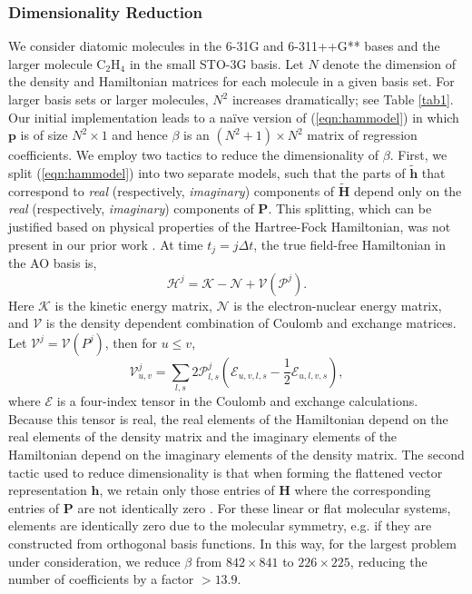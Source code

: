 \documentclass[10pt]{article}
\newcommand{\ethylene}{\ensuremath{\text{C}_2\text{H}_4} }
\begin{document}
\subsubsection{Dimensionality Reduction}
We consider diatomic molecules in the 6-31G and 6-311++G** bases and the larger molecule \ethylene in the small STO-3G basis.  Let $N$ denote the dimension of the density and Hamiltonian matrices for each molecule in a given basis set. For larger basis sets or larger molecules, $N^2$ increases dramatically; see Table \ref{tab1}.  Our initial implementation leads to a na\"ive version of (\ref{eqn:hammodel}) in which $\mathbf{p}$ is of size $N^2 \times 1$ and hence $\beta$ is an $(N^2 + 1) \times N^2$ matrix of regression coefficients.  We employ two tactics to reduce the dimensionality of $\beta$.  First, we split (\ref{eqn:hammodel}) into two separate models, such that the parts of $\widetilde{\mathbf{h}}$ that correspond to \emph{real} (respectively, \emph{imaginary}) components of $\widetilde{\mathbf{H}}$ depend only on the \emph{real} (respectively, \emph{imaginary}) components of $\mathbf{P}$.  This splitting, which can be justified based on physical properties of the Hartree-Fock Hamiltonian, was not present in our prior work \cite{bhat2020machine}. At time $t_j = j \Delta t$, the true field-free Hamiltonian in the AO basis is,
\begin{equation}
\label{eqn:ffham}
\mathcal{H}^j = \mathcal{K} - \mathcal{N} + \mathcal{V}(\mathcal{P}^j).
\end{equation}
Here $\mathcal{K}$ is the kinetic energy matrix, $\mathcal{N}$ is the electron-nuclear energy matrix, and $\mathcal{V}$ is the density dependent combination of Coulomb and exchange matrices. Let $\mathcal{V}^j = \mathcal{V}(P^j)$, then for $u \leq v$,
\begin{equation}
\mathcal{V}^j_{u,v} = \sum_{l, s} 2 \mathcal{P}^j_{l,s} \left( \mathcal{E}_{u,v,l,s} - \frac{1}{2} \mathcal{E}_{u,l,v,s} \right),
\end{equation}
where $\mathcal{E}$ is a four-index tensor in the Coulomb and exchange calculations. Because this tensor is real, the real elements of the Hamiltonian depend on the real elements of the density matrix and the imaginary elements of the Hamiltonian depend on the imaginary elements of the density matrix.  The second tactic used to reduce dimensionality is that when forming the flattened vector representation $\mathbf{h}$, we retain only those entries of $\mathbf{H}$ where the corresponding entries of $\mathbf{P}$ are not identically zero \cite{bhat2020machine}. For these linear or flat molecular systems, elements are identically zero due to the molecular symmetry, e.g. if they are constructed from orthogonal basis functions. In this way, for the largest problem under consideration, we reduce $\beta$ from $842 \times 841$ to $226\times225$, reducing the number of coefficients by a factor $>13.9$.
\end{document}
